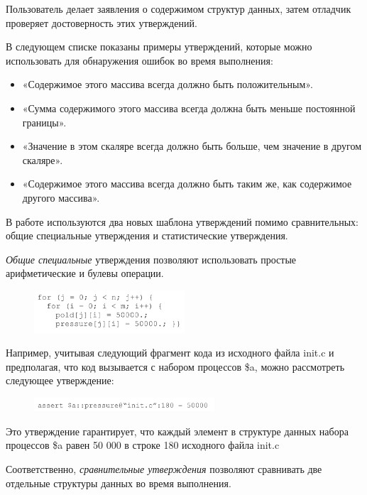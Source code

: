 Пользователь делает заявления о содержимом структур данных, затем отладчик проверяет достоверность этих утверждений.

В следующем списке показаны примеры утверждений, которые можно использовать для обнаружения ошибок во время выполнения:

\begin{itemize}
	\item «Содержимое этого массива всегда должно быть положительным».
	\item «Сумма содержимого этого массива всегда должна быть меньше постоянной границы».
	\item «Значение в этом скаляре всегда должно быть больше, чем значение в другом скаляре».
	\item «Содержимое этого массива всегда должно быть таким же, как содержимое другого массива». 
\end{itemize}

В работе используются два новых шаблона утверждений помимо сравнительных: общие специальные утверждения и статистические утверждения.

\textit{Общие специальные} утверждения позволяют использовать простые арифметические и булевы операции.

\begin{figure}[h]
	\includegraphics[width=0.5\textwidth]{ResearchNotes/rndhpc_not_edt_2021_11_10/krekhtunova/data_prog.png}
\end{figure}

Например, учитывая следующий фрагмент кода из исходного файла init.c и предполагая, что код вызывается с набором процессов \$a, можно рассмотреть следующее утверждение:

\begin{figure}[h]
	\includegraphics[width=0.6\textwidth]{ResearchNotes/rndhpc_not_edt_2021_11_10/krekhtunova/assert1.png}
\end{figure}

Это утверждение гарантирует, что каждый элемент в структуре данных набора процессов \$a равен 50 000 в строке 180 исходного файла init.c

Соответственно, \textit{сравнительные утверждения} позволяют сравнивать две отдельные структуры данных во время выполнения.

